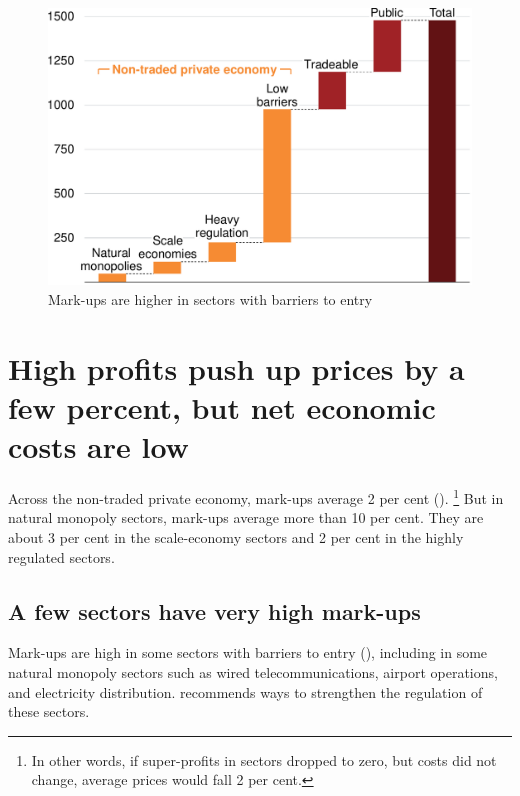 \begin{figure}
    \caption{Mark-ups are higher in sectors with barriers to entry \label{fig:SNP-pc-of-rev}}
    \includegraphics[page=24]{atlas/Charts} 
\end{figure}

\section{High profits push up prices by a few percent, but net economic costs are low} 
Across the non-traded private economy, mark-ups average 2 per cent ().%
    \footnote{In other words, if super-profits in sectors dropped to zero, but costs did not change, average prices would fall 2 per cent.}
But in natural monopoly sectors, mark-ups average more than 10 per cent. They are about 3 per cent in the scale-economy sectors and 2 per cent in the highly regulated sectors.

\subsection{A few sectors have very high mark-ups}

Mark-ups are high in some sectors with barriers to entry (), including in some natural monopoly sectors such as wired telecommunications, airport operations, and electricity distribution.  recommends ways to strengthen the regulation of these sectors.

